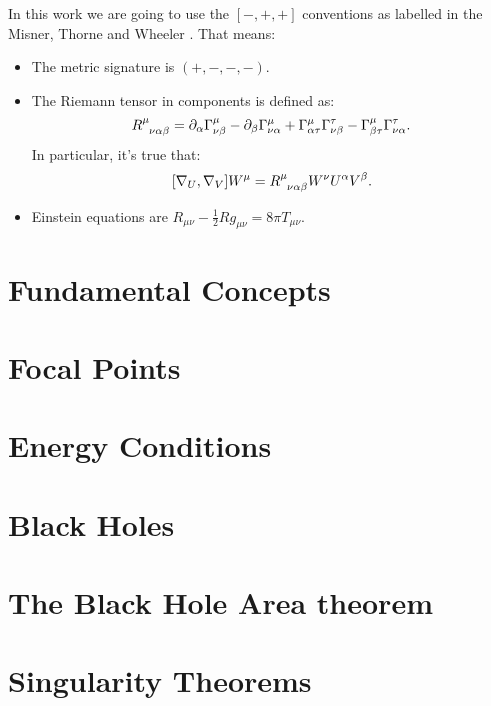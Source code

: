 \documentclass[12pt, a4paper]{book}
\begin{document}
In this work we are going to use the \([-, + , +]\) conventions as labelled in the Misner, Thorne and Wheeler \cite{misner1973gravitation}. That means:
\begin{itemize}
	\item[\ding{99}] The metric signature is \((+, -, -, -)\).
	\item[\ding{99}]  The Riemann tensor in components is defined as:
	\[
	R\indices{^{\mu}_{\nu\alpha\beta}} = \partial_{\alpha}\Gamma^{\mu}_{\nu\beta} - \partial_{\beta}\Gamma^{\mu}_{\nu\alpha} + \Gamma^{\mu}_{\alpha\tau}\Gamma^{\tau}_{\nu\beta} - \Gamma^{\mu}_{\beta\tau}\Gamma^{\tau}_{\nu\alpha}.
	\]
	In particular, it's true that:
	\[
	[\nabla_U, \nabla_V] W^{\mu} = R\indices{^{\mu}_{\nu\alpha\beta}}W^{\nu}U^{\alpha}V^{\beta}.
	\]
	\item[\ding{99}]  Einstein equations are \(R_{\mu\nu} - \frac{1}{2}Rg_{\mu\nu} = 8\pi T_{\mu\nu}\).
\end{itemize}


\chapter{Fundamental Concepts}


\chapter{Focal Points}
\label{ch:focal-points}


\chapter{Energy Conditions}
\label{ch:energy-conditions}


\chapter{Black Holes}


\chapter{The Black Hole Area theorem}

\clearpage

\chapter{Singularity Theorems}
\label{ch:singularity-theorems} 



\printbibliography
\end{document}
